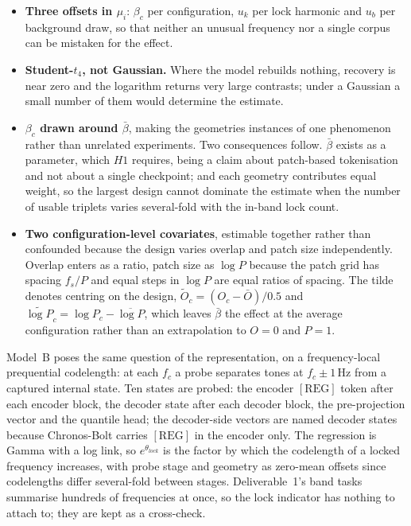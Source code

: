 \begin{itemize}\setlength{\itemsep}{2pt}
    \item \textbf{Three offsets in $\mu_i$}: $\beta_c$ per configuration, $u_k$ per lock harmonic and $u_b$ per background draw, so that neither an unusual frequency nor a single corpus can be mistaken for the effect.
    \item \textbf{Student-$t_4$, not Gaussian.} Where the model rebuilds nothing, recovery is near zero and the logarithm returns very large contrasts; under a Gaussian a small number of them would determine the estimate.
    \item \textbf{$\beta_c$ drawn around $\bar\beta$}, making the geometries instances of one phenomenon rather than unrelated experiments. Two consequences follow. $\bar\beta$ exists as a parameter, which $H1$ requires, being a claim about patch-based tokenisation and not about a single checkpoint; and each geometry contributes equal weight, so the largest design cannot dominate the estimate when the number of usable triplets varies several-fold with the in-band lock count.
    \item \textbf{Two configuration-level covariates}, estimable together rather than confounded because the design varies overlap and patch size independently. Overlap enters as a ratio, patch size as $\log P$ because the patch grid has spacing $f_s/P$ and equal steps in $\log P$ are equal ratios of spacing. The tilde denotes centring on the design, $\widetilde O_c=(O_c-\bar O)/0.5$ and $\widetilde{\log P}_c=\log P_c-\overline{\log P}$, which leaves $\bar\beta$ the effect at the average configuration rather than an extrapolation to $O=0$ and $P=1$.
\end{itemize}

Model~B poses the same question of the representation, on a frequency-local prequential codelength: at each $f_c$ a probe separates tones at $f_c \pm 1$\,Hz from a captured internal state. Ten states are probed: the encoder $[\mathrm{REG}]$ token after each encoder block, the decoder state after each decoder block, the pre-projection vector and the quantile head; the decoder-side vectors are named decoder states because Chronos-Bolt carries $[\mathrm{REG}]$ in the encoder only. The regression is Gamma with a log link, so $e^{\theta_{lock}}$ is the factor by which the codelength of a locked frequency increases, with probe stage and geometry as zero-mean offsets since codelengths differ several-fold between stages. Deliverable~1's band tasks summarise hundreds of frequencies at once, so the lock indicator has nothing to attach to; they are kept as a cross-check.


